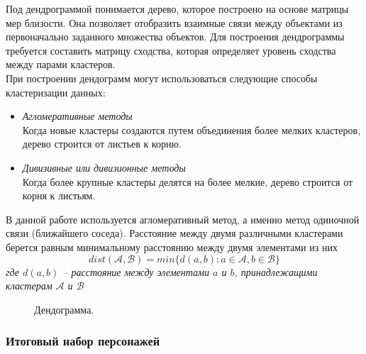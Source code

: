 \documentclass[a4paper,14pt]{extreport} %
\begin{document}
Под дендрограммой понимается дерево, которое построено на основе матрицы мер близости. Она позволяет отобразить взаимные связи между объектами из первоначально заданного множества объектов. Для построения дендрограммы требуется составить матрицу сходства, которая определяет уровень сходства между парами кластеров. \\
При построении дендограмм могут использоваться следующие способы кластеризации данных:
\begin{itemize}
\item {\it Агломеративные методы} \\
Когда новые кластеры создаются путем объединения более мелких кластеров, дерево строится от листьев к корню.
\item {\it Дивизивные или дивизионные методы} \\
Когда более крупные кластеры делятся на более мелкие, дерево строится от корня к листьям.
\end{itemize}
В данной работе используется агломеративный метод, а именно метод одиночной связи (ближайшего соседа).
Расстояние между двумя различными кластерами берется равным минимальному расстоянию между двумя элементами из них
\textit{
\begin{equation}
\label{dendogramm_algo}
 dist(\mathcal{A},\mathcal{B}) = min \{ d(a, b) : a \in \mathcal{A}, b \in \mathcal{B} \}
\end{equation}
где $d(a, b)$ -- расстояние между элементами $a$ и $b$, принадлежащими кластерам $\mathcal{A}$ и $\mathcal{B}$ 
}

\begin{figure}[H]
\caption{Дендограмма.}
\label{user-stories}
\end{figure}

\subsubsection{Итоговый набор персонажей}
\end{document}
